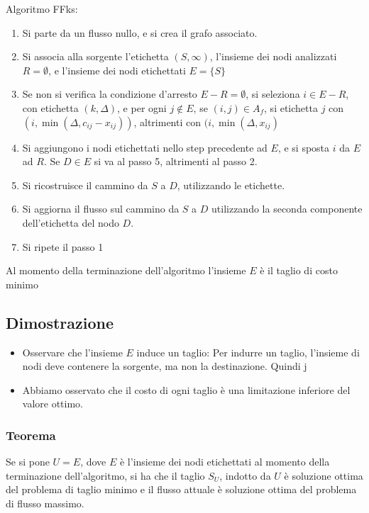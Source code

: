\documentclass[../template]{subfiles}
\begin{document}
Algoritmo FFks:
\begin{enumerate}
    \item Si parte da un flusso nullo, e si crea il grafo associato.
    \item Si associa alla sorgente l'etichetta $(S, \infty)$, l'insieme dei nodi analizzati $R = \emptyset$, e l'insieme dei nodi etichettati $E = \{S\}$
    \item Se non si verifica la condizione d'arresto $E - R = \emptyset$, si seleziona $i \in E - R$, con etichetta $(k, \Delta)$, e per ogni $j \notin E$,
        se $(i, j) \in A_f$, si etichetta $j$ con $(i, \min(\Delta, c_{ij} - x_{ij}))$, altrimenti con $(i, \min(\Delta,  x_{ij})$
    \item Si aggiungono i nodi etichettati nello step precedente ad $E$, e si sposta $i$ da $E$ ad $R$.
        Se $D \in E$ si va al passo 5, altrimenti al passo 2.
    \item Si ricostruisce il cammino da $S$ a $D$, utilizzando le etichette.
    \item Si aggiorna il flusso sul cammino da $S$ a $D$ utilizzando la seconda componente dell'etichetta del nodo $D$.
    \item Si ripete il passo 1
\end{enumerate}
Al momento della terminazione dell'algoritmo l'insieme $E$ è il taglio di costo minimo
\subsection{Dimostrazione}
\begin{itemize}
    \item Osservare che l'insieme $E$ induce un taglio:
        Per indurre un taglio, l'insieme di nodi deve contenere la sorgente, ma non la destinazione. Quindi j
    \item  Abbiamo osservato che il costo di ogni taglio è una limitazione inferiore del valore ottimo.
\end{itemize}



\subsubsection{Teorema}
Se si pone $U = E$, dove $E$ è l'insieme dei nodi etichettati al momento della terminazione dell'algoritmo, si ha che il taglio $S_U$, indotto
da $U$ è soluzione ottima del problema di taglio minimo e il flusso attuale è soluzione ottima del problema di flusso massimo.
\end{document}
